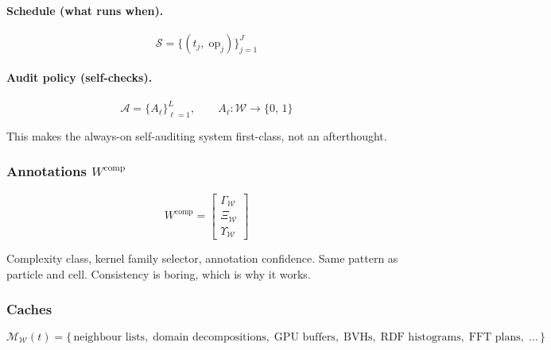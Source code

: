\documentclass[11pt, a4paper, oneside]{article}
\theoremstyle{definition}
\theoremstyle{remark}
\begin{document}
\paragraph{Schedule (what runs when).}
\begin{equation}
  \mathcal{S} = \{(t_j,\;\mathrm{op}_j)\}_{j=1}^{J}
  \label{eq:schedule}
\end{equation}

\paragraph{Audit policy (self-checks).}
\begin{equation}
  \mathcal{A} = \{A_\ell\}_{\ell=1}^{L},
  \qquad A_\ell : \mathcal{W} \to \{0,\,1\}
  \label{eq:audit-policy}
\end{equation}

\noindent
This makes the always-on self-auditing system first-class, not an
afterthought.

\subsubsection{Annotations \texorpdfstring{$W^{\mathrm{comp}}$}{Wcomp}}
\label{sec:world-comp}

\begin{equation}
  W^{\mathrm{comp}} =
  \begin{bmatrix}
    \Gamma_{\mathcal{W}} \\[3pt]
    \Xi_{\mathcal{W}} \\[3pt]
    \Upsilon_{\mathcal{W}}
  \end{bmatrix}
  \label{eq:world-comp}
\end{equation}

Complexity class, kernel family selector, annotation confidence.
Same pattern as particle and cell.
Consistency is boring, which is why it works.

\subsubsection{Caches}
\label{sec:world-cache}

\begin{equation}
  \mathcal{M}_{\mathcal{W}}(t) =
  \{\,\text{neighbour lists},\;
     \text{domain decompositions},\;
     \text{GPU buffers},\;
     \text{BVHs},\;
     \text{RDF histograms},\;
     \text{FFT plans},\;
     \ldots\,\}
  \label{eq:world-cache}
\end{equation}
\end{document}

